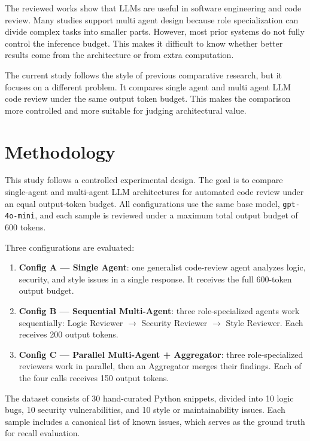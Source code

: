 \documentclass[pdflatex,sn-mathphys-num]{sn-jnl}
\theoremstyle{thmstyleone}
\theoremstyle{thmstyletwo}
\theoremstyle{thmstylethree}
\begin{document}
The reviewed works show that LLMs are useful in software engineering and code review. Many studies support multi agent design because role specialization can divide complex tasks into smaller parts. However, most prior systems do not fully control the inference budget. This makes it difficult to know whether better results come from the architecture or from extra computation.

The current study follows the style of previous comparative research, but it focuses on a different problem. It compares single agent and multi agent LLM code review under the same output token budget. This makes the comparison more controlled and more suitable for judging architectural value.

\section{Methodology}\label{sec:methodology}

This study follows a controlled experimental design. The goal is to compare single-agent and multi-agent LLM architectures for automated code review under an equal output-token budget. All configurations use the same base model, \texttt{gpt-4o-mini}, and each sample is reviewed under a maximum total output budget of 600 tokens.

Three configurations are evaluated:
\begin{enumerate}[leftmargin=*,itemsep=2pt,topsep=2pt]
    \item \textbf{Config A --- Single Agent}: one generalist code-review agent analyzes logic, security, and style issues in a single response. It receives the full 600-token output budget.
    \item \textbf{Config B --- Sequential Multi-Agent}: three role-specialized agents work sequentially: Logic Reviewer $\rightarrow$ Security Reviewer $\rightarrow$ Style Reviewer. Each receives 200 output tokens.
    \item \textbf{Config C --- Parallel Multi-Agent + Aggregator}: three role-specialized reviewers work in parallel, then an Aggregator merges their findings. Each of the four calls receives 150 output tokens.
\end{enumerate}

The dataset consists of 30 hand-curated Python snippets, divided into 10 logic bugs, 10 security vulnerabilities, and 10 style or maintainability issues. Each sample includes a canonical list of known issues, which serves as the ground truth for recall evaluation.
\end{document}
